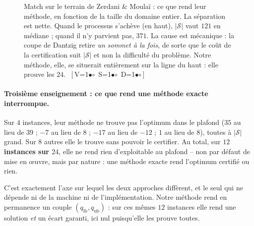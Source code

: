 \documentclass[11pt,a4paper]{article}
\theoremstyle{plain}
\theoremstyle{remark}
\newcommand{\Scal}{\mathcal{S}}
\newcommand{\cfgm}[1]{\ifnum#1=1$\bullet$\else$\circ$\fi}
\newcommand{\conf}[3]{%
  \textsf{\footnotesize[\,V\cfgm{#1}\ S\cfgm{#2}\ D\cfgm{#3}\,]}}
\begin{document}
\begin{figure}[H]
\centering
{}
\caption{Match sur le terrain de Zerdani \& Moulaï : ce que rend leur
méthode, en fonction de la taille du domaine entier. La séparation est
nette. Quand le processus s'achève (en haut), $|\Scal|$ vaut $121$ en
médiane ; quand il n'y parvient pas, $371$. La cause est mécanique : la
coupe de Dantzig retire \emph{un sommet à la fois}, de sorte que le coût de
la certification suit $|\Scal|$ et non la difficulté du problème. Notre
méthode, elle, se situerait entièrement sur la ligne du haut : elle prouve
les $24$.\ \conf{0}{0}{0}}
\label{fig:matchzm}
\end{figure}

\paragraph{Troisième enseignement : ce que rend une méthode exacte
interrompue.} Sur $4$ instances, leur méthode ne trouve pas l'optimum dans
le plafond ($35$ au lieu de $39$ ; $-7$ au lieu de $8$ ; $-17$ au lieu de
$-12$ ; $1$ au lieu de $8$), toutes à $|\Scal|$ grand. Sur $8$ autres elle
le trouve sans pouvoir le certifier. Au total, sur \textbf{$12$ instances
sur $24$}, elle ne rend rien d'exploitable au plafond -- non par défaut de
mise en \oe uvre, mais par nature : une méthode exacte rend l'optimum
certifié ou rien.

C'est exactement l'axe sur lequel les deux approches diffèrent, et le seul
qui ne dépende ni de la machine ni de l'implémentation. Notre méthode rend
en permanence un couple $(q_{\text{lb}}, q_{\text{ub}})$ : sur ces mêmes
$12$ instances elle rend une solution \emph{et} un écart garanti, ici nul
puisqu'elle les prouve toutes.
\end{document}
